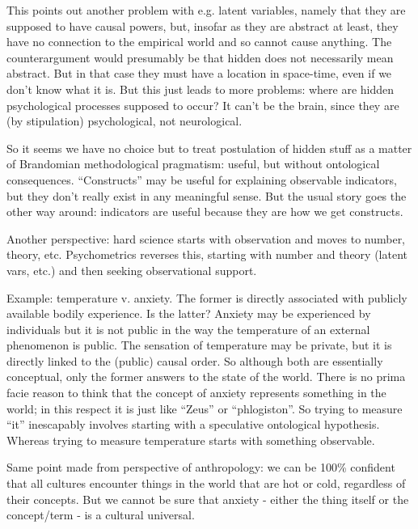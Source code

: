 \documentclass[11pt,twoside]{article}
\begin{document}
This points out another problem with e.g. latent variables, namely
that they are supposed to have causal powers, but, insofar as they are
abstract at least, they have no connection to the empirical world and
so cannot cause anything.  The counterargument would presumably be
that hidden does not necessarily mean abstract.  But in that case they
must have a location in space-time, even if we don't know what it is.
But this just leads to more problems: where are hidden psychological
processes supposed to occur?  It can't be the brain, since they are
(by stipulation) psychological, not neurological.

So it seems we have no choice but to treat postulation of hidden stuff
as a matter of Brandomian methodological pragmatism: useful, but
without ontological consequences.  ``Constructs'' may be useful for
explaining observable indicators, but they don't really exist in any
meaningful sense.  But the usual story goes the other way around:
indicators are useful because they are how we get constructs.

Another perspective: hard science starts with observation and moves to
number, theory, etc.  Psychometrics reverses this, starting with
number and theory (latent vars, etc.) and then seeking observational
support.

Example: temperature v. anxiety.  The former is directly associated
with publicly available bodily experience.  Is the latter?  Anxiety
may be experienced by individuals but it is not public in the way the
temperature of an external phenomenon is public.  The sensation of
temperature may be private, but it is directly linked to the (public)
causal order.  So although both are essentially conceptual, only the
former answers to the state of the world.  There is no prima facie
reason to think that the concept of anxiety represents something in
the world; in this respect it is just like ``Zeus'' or ``phlogiston''.
So trying to measure ``it'' inescapably involves starting with a
speculative ontological hypothesis.  Whereas trying to measure
temperature starts with something observable.

Same point made from perspective of anthropology: we can be 100\%
confident that all cultures encounter things in the world that are hot
or cold, regardless of their concepts.  But we cannot be sure that
anxiety - either the thing itself or the concept/term - is a cultural
universal.
\end{document}
